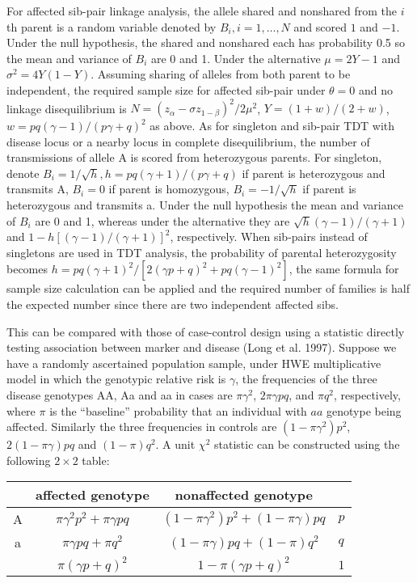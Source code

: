 For affected sib-pair linkage analysis, the allele shared and nonshared from
the $i$th parent is a random variable denoted by $B_i, i=1,\ldots,N$ and scored
$1$ and $-1$.  Under the null hypothesis, the shared and nonshared each has
probability 0.5 so the mean and variance of $B_i$ are 0 and 1.  Under the
alternative $\mu=2Y-1$ and $\sigma^2=4Y(1-Y)$.  Assuming sharing of alleles
from both parent to be independent, the required sample size for affected
sib-pair under $\theta=0$ and no linkage disequilibrium is $N={(z_\alpha-\sigma
z_{1-\beta})^2}/{2\mu^2}$, $Y={(1+w)}/{(2+w)}$,
$w={pq(\gamma-1)}/{(p\gamma+q)^2}$ as above.  As for singleton and sib-pair TDT
with disease locus or a nearby locus in complete disequilibrium, the number of
transmissions of allele A is scored from heterozygous parents.  For singleton,
denote $B_i=1/\sqrt{h}, h={pq(\gamma+1)}/{(p\gamma+q)}$ if parent is
heterozygous and transmits A, $B_i=0$ if parent is homozygous,
$B_i=-1/\sqrt{h}$ if parent is heterozygous and transmits a.  Under the null
hypothesis the mean and variance of $B_i$ are 0 and 1, whereas under the
alternative they are $\sqrt{h}{(\gamma-1)}/{(\gamma+1)}$ and
$1-h[{(\gamma-1)}/{(\gamma+1)}]^2$, respectively.  When sib-pairs instead of
singletons are used in TDT analysis, the probability of parental heterozygosity
becomes $h={pq(\gamma+1)^2}/{[2(\gamma p+q)^2+pq(\gamma-1)^2]}$, the same
formula for sample size calculation can be applied and the required number of
families is half the expected number since there are two independent affected
sibs.

This can be compared with those of case-control design using a statistic
directly testing association between marker and disease (Long et al.  1997).
Suppose we have a randomly ascertained population sample, under HWE
multiplicative model in which the genotypic relative risk is $\gamma$, the
frequencies of the three disease genotypes AA, Aa and aa in cases are
$\pi\gamma^2$, $2\pi\gamma pq$, and $\pi q^2$, respectively, where $\pi$ is the
``baseline'' probability that an individual with $aa$ genotype being affected.
Similarly the three frequencies in controls are $(1-\pi\gamma^2)p^2$,
$2(1-\pi\gamma)pq$ and $(1-\pi)q^2$.  A unit $\chi^2$ statistic can be
constructed using the following $2\times 2$ table:

\medskip
\begin{center}\begin{tabular}{c|cc|l}
  & affected genotype & nonaffected genotype & \\
\hline
A & $\pi\gamma^2p^2+\pi\gamma pq$ & $(1-\pi\gamma^2)p^2+(1-\pi\gamma)pq$ &$p$\\
a & $\pi\gamma pq+\pi q^2$ & $(1-\pi\gamma)pq+(1-\pi)q^2$ & $q$ \\
\hline
  & $\pi(\gamma p+q)^2$ & $1-\pi(\gamma p+q)^2$ & $1$ \\
\end{tabular}\end{center}

